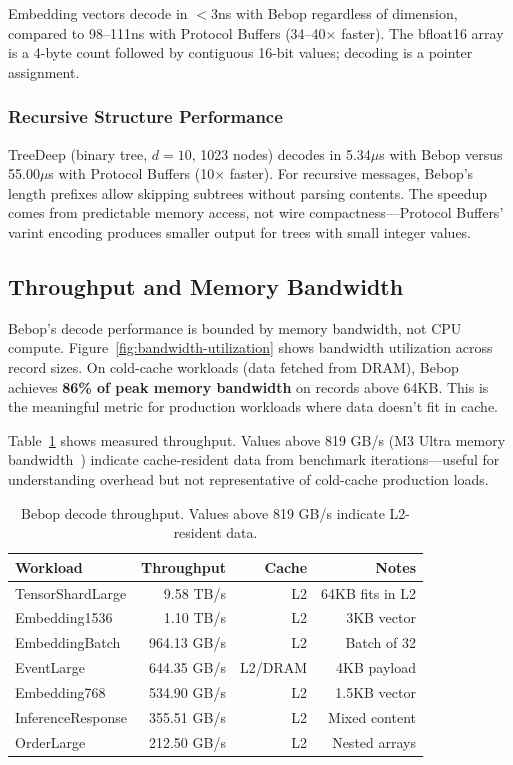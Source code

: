 \documentclass[10pt,onecolumn]{article}
\begin{document}
Embedding vectors decode in $<$3ns with Bebop regardless of dimension, compared to 98--111ns with Protocol Buffers (34--40$\times$ faster). The bfloat16 array is a 4-byte count followed by contiguous 16-bit values; decoding is a pointer assignment.

\subsubsection{Recursive Structure Performance}

TreeDeep (binary tree, $d{=}10$, 1023 nodes) decodes in 5.34$\mu$s with Bebop versus 55.00$\mu$s with Protocol Buffers (10$\times$ faster). For recursive messages, Bebop's length prefixes allow skipping subtrees without parsing contents. The speedup comes from predictable memory access, not wire compactness---Protocol Buffers' varint encoding produces smaller output for trees with small integer values.

\subsection{Throughput and Memory Bandwidth}

Bebop's decode performance is bounded by memory bandwidth, not CPU compute. Figure~\ref{fig:bandwidth-utilization} shows bandwidth utilization across record sizes. On cold-cache workloads (data fetched from DRAM), Bebop achieves \textbf{86\% of peak memory bandwidth} on records above 64KB. This is the meaningful metric for production workloads where data doesn't fit in cache.

Table~\ref{tab:throughput} shows measured throughput. Values above 819 GB/s (M3 Ultra memory bandwidth~\cite{m3-ultra}) indicate cache-resident data from benchmark iterations---useful for understanding overhead but not representative of cold-cache production loads.

\begin{table}[ht]
\centering
\begin{tabular}{@{}lrrr@{}}
\toprule
\textbf{Workload} & \textbf{Throughput} & \textbf{Cache} & \textbf{Notes} \\
\midrule
TensorShardLarge & 9.58 TB/s & L2 & 64KB fits in L2 \\
Embedding1536 & 1.10 TB/s & L2 & 3KB vector \\
EmbeddingBatch & 964.13 GB/s & L2 & Batch of 32 \\
EventLarge & 644.35 GB/s & L2/DRAM & 4KB payload \\
Embedding768 & 534.90 GB/s & L2 & 1.5KB vector \\
InferenceResponse & 355.51 GB/s & L2 & Mixed content \\
OrderLarge & 212.50 GB/s & L2 & Nested arrays \\
\bottomrule
\end{tabular}
\caption{Bebop decode throughput. Values above 819 GB/s indicate L2-resident data.}
\label{tab:throughput}
\end{table}
\end{document}
